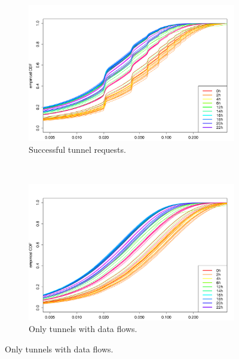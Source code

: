 \begin{figure}
        \centering
        \begin{subfigure}[b]{0.50\textwidth}
                \centering
                \includegraphics[width=\textwidth]{images/IMC2013/R-IAT-successful-2h-ecdfs.png}
                \caption{Successful tunnel requests.}
                \label{fig:IAT-ecdf-2h-successful}
        \end{subfigure}%
        ~
        \begin{subfigure}[b]{0.50\textwidth}
                \centering
                \includegraphics[width=\textwidth]{images/IMC2013/R-IAT-fromflows-ecdfs-2h.png}
                \caption{Only tunnels with data flows.}
                \label{fig:IAT-ecdf-2h-active}
        \end{subfigure}
        

\end{figure}
